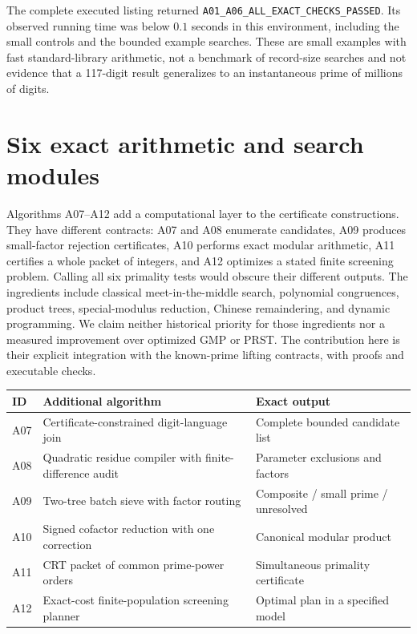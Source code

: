 \documentclass[11pt,a4paper]{article}
\theoremstyle{definition}\newtheorem{definition}[theorem]{Definition}
\theoremstyle{remark}\newtheorem{remark}[theorem]{Remark}
\begin{document}
The complete executed listing returned
\texttt{A01\_A06\_ALL\_EXACT\_CHECKS\_PASSED}.
Its observed running time was below $0.1$ seconds in this environment,
including the small controls and the bounded example searches. These are
small examples with fast standard-library arithmetic, not a benchmark of
record-size searches and not evidence that a 117-digit result generalizes
to an instantaneous prime of millions of digits.

\section{Six exact arithmetic and search modules}
\label{sec:arith18}

Algorithms A07--A12 add a computational layer to the certificate constructions.
They have different contracts: A07 and A08 enumerate candidates, A09 produces
small-factor rejection certificates, A10 performs exact modular arithmetic,
A11 certifies a whole packet of integers, and A12 optimizes a stated finite
screening problem. Calling all six primality tests would obscure their
different outputs. The ingredients include classical meet-in-the-middle
search, polynomial congruences, product trees, special-modulus reduction,
Chinese remaindering, and dynamic programming. We claim neither historical
priority for those ingredients nor a measured improvement over optimized
GMP or PRST. The contribution here is their explicit integration with the
known-prime lifting contracts, with proofs and executable checks.

\begin{center}\small
\begin{tabularx}{\textwidth}{@{}lXl@{}}
\toprule
ID & Additional algorithm & Exact output\\
\midrule
A07 & Certificate-constrained digit-language join & Complete bounded candidate list\\
A08 & Quadratic residue compiler with finite-difference audit & Parameter exclusions and factors\\
A09 & Two-tree batch sieve with factor routing & Composite / small prime / unresolved\\
A10 & Signed cofactor reduction with one correction & Canonical modular product\\
A11 & CRT packet of common prime-power orders & Simultaneous primality certificate\\
A12 & Exact-cost finite-population screening planner & Optimal plan in a specified model\\
\bottomrule
\end{tabularx}
\end{center}
\end{document}
